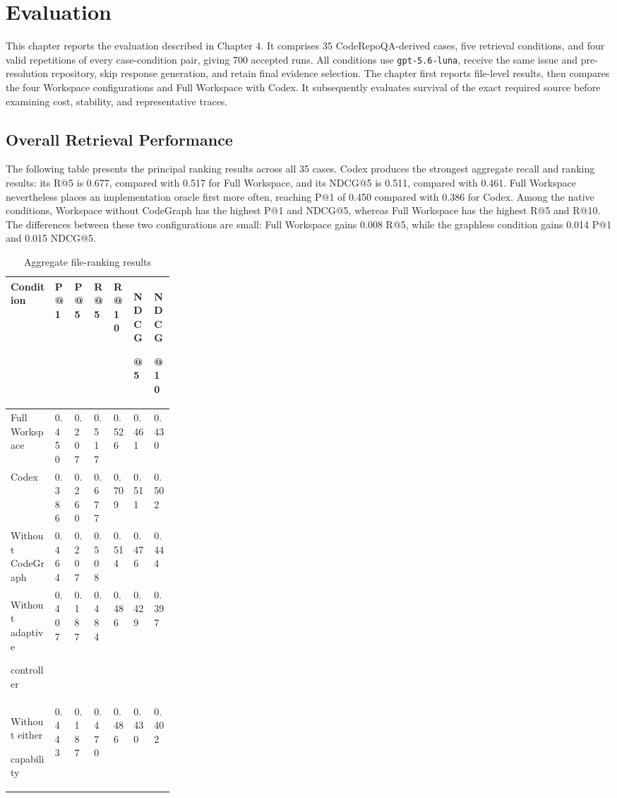 \chapter{Evaluation}\label{ch:evaluation}

This chapter reports the evaluation described in Chapter 4. It comprises 35 CodeRepoQA-derived cases, five retrieval conditions, and four valid repetitions of every case-condition pair, giving 700 accepted runs. All conditions use \texttt{gpt-5.6-luna}, receive the same issue and pre-resolution repository, skip response generation, and retain final evidence selection. The chapter first reports file-level results, then compares the four Workspace configurations and Full Workspace with Codex. It subsequently evaluates survival of the exact required source before examining cost, stability, and representative traces.

\section{Overall Retrieval Performance}\label{sec:overall-retrieval-performance}

The following table presents the principal ranking results across all 35 cases. Codex produces the strongest aggregate recall and ranking results: its R@5 is 0.677, compared with 0.517 for Full Workspace, and its NDCG@5 is 0.511, compared with 0.461. Full Workspace nevertheless places an implementation oracle first more often, reaching P@1 of 0.450 compared with 0.386 for Codex. Among the native conditions, Workspace without CodeGraph has the highest P@1 and NDCG@5, whereas Full Workspace has the highest R@5 and R@10. The differences between these two configurations are small: Full Workspace gains 0.008 R@5, while the graphless condition gains 0.014 P@1 and 0.015 NDCG@5.

\begin{table}[htbp]
\centering
\caption{Aggregate file-ranking results}\label{tab:aggregate-file-ranking-results-1}

\begingroup
\small
\setlength{\tabcolsep}{3pt}
\renewcommand{\arraystretch}{1.10}
\begin{tabularx}{0.97\linewidth}{@{}L{0.27\linewidth}*{6}{Z}@{}}
\toprule
\textbf{Condition} & \textbf{P@1} & \textbf{P@5} & \textbf{R@5} & \textbf{R@10} & \textbf{NDCG}\par\textbf{@5} & \textbf{NDCG}\par\textbf{@10} \\
\midrule
Full Workspace & 0.450 & 0.207 & 0.517 & 0.526 & 0.461 & 0.430 \\
Codex & 0.386 & 0.260 & 0.677 & 0.709 & 0.511 & 0.502 \\
Without CodeGraph & 0.464 & 0.207 & 0.508 & 0.514 & 0.476 & 0.444 \\
Without adaptive\par controller & 0.407 & 0.187 & 0.484 & 0.486 & 0.429 & 0.397 \\
Without either\par capability & 0.443 & 0.187 & 0.470 & 0.486 & 0.430 & 0.402 \\
\bottomrule
\end{tabularx}
\endgroup
\end{table}
\FloatBarrier

